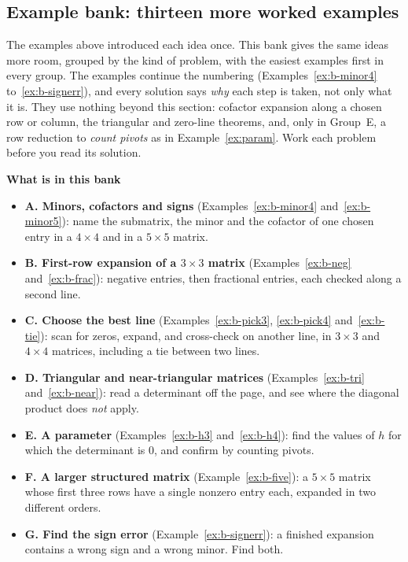 \documentclass[11pt]{article}
\begin{document}
\subsection*{Example bank: thirteen more worked examples}

The examples above introduced each idea once. This bank gives the same ideas more room, grouped by the kind of problem, with the easiest examples first in every group. The examples continue the numbering (Examples~\ref{ex:b-minor4} to~\ref{ex:b-signerr}), and every solution says \emph{why} each step is taken, not only what it is. They use nothing beyond this section: cofactor expansion along a chosen row or column, the triangular and zero-line theorems, and, only in Group~E, a row reduction to \emph{count pivots} as in Example~\ref{ex:param}. Work each problem before you read its solution.

\textbf{What is in this bank}
\begin{itemize}
  \item \textbf{A. Minors, cofactors and signs} (Examples~\ref{ex:b-minor4} and~\ref{ex:b-minor5}): name the submatrix, the minor and the cofactor of one chosen entry in a $4\times4$ and in a $5\times5$ matrix.
  \item \textbf{B. First-row expansion of a $3\times3$ matrix} (Examples~\ref{ex:b-neg} and~\ref{ex:b-frac}): negative entries, then fractional entries, each checked along a second line.
  \item \textbf{C. Choose the best line} (Examples~\ref{ex:b-pick3}, \ref{ex:b-pick4} and~\ref{ex:b-tie}): scan for zeros, expand, and cross-check on another line, in $3\times3$ and $4\times4$ matrices, including a tie between two lines.
  \item \textbf{D. Triangular and near-triangular matrices} (Examples~\ref{ex:b-tri} and~\ref{ex:b-near}): read a determinant off the page, and see where the diagonal product does \emph{not} apply.
  \item \textbf{E. A parameter} (Examples~\ref{ex:b-h3} and~\ref{ex:b-h4}): find the values of $h$ for which the determinant is $0$, and confirm by counting pivots.
  \item \textbf{F. A larger structured matrix} (Example~\ref{ex:b-five}): a $5\times5$ matrix whose first three rows have a single nonzero entry each, expanded in two different orders.
  \item \textbf{G. Find the sign error} (Example~\ref{ex:b-signerr}): a finished expansion contains a wrong sign and a wrong minor. Find both.
\end{itemize}
\end{document}
